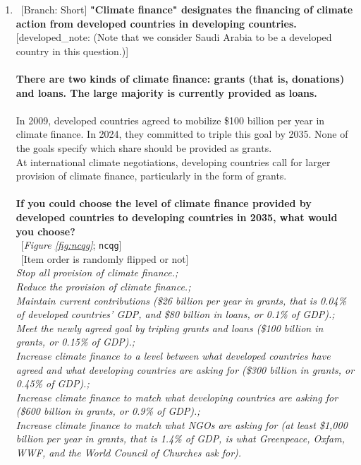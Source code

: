 \begin{enumerate}[resume]
\item ~[Branch: Short] \label{q:ncqg} \textbf{"Climate finance" designates the financing of climate action from developed countries in developing countries.} [developed\_note: (Note that we consider Saudi Arabia to be a developed country in this question.)]\\\\\textbf{There are two kinds of climate finance: grants (that is, donations) and loans. The large majority is currently provided as loans.~}\\\\In 2009, developed countries agreed to mobilize \$100 billion per year in climate finance. In 2024, they committed to triple this goal by 2035. None of the goals specify which share should be provided as grants.~\\At international climate negotiations, developing countries call for larger provision of climate finance, particularly in the form of grants.\\\\\textbf{If you could choose the level of climate finance provided by developed countries to developing countries in 2035, what would you choose?}\\ 
~[\textit{Figure \ref{fig:ncqg}}; 
\verb|ncqg|]\\
~[Item order is randomly flipped or not]
  \\ \textit{Stop all provision of climate finance.; \\Reduce the provision of climate finance.; \\Maintain current contributions (\$26 billion per year in grants, that is 0.04\% of developed countries' GDP, and \$80 billion in loans, or 0.1\% of GDP).; \\ Meet the newly agreed goal by tripling grants and loans (\$100 billion in grants, or 0.15\% of GDP).; \\ Increase climate finance to a level between what developed countries have agreed and what developing countries are asking for (\$300 billion in grants, or 0.45\% of GDP).; \\Increase climate finance to match what developing countries are asking for (\$600 billion in grants, or 0.9\% of GDP).; \\Increase climate finance to match what NGOs are asking for (at least \$1,000 billion per year in grants, that is 1.4\% of GDP, is what Greenpeace, Oxfam, WWF, and the World Council of Churches ask for).}

\end{enumerate} 

